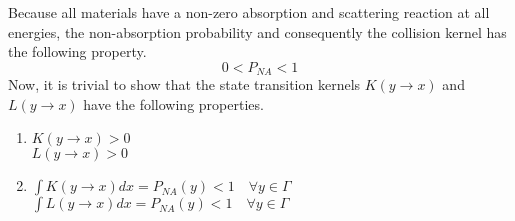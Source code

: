 Because all materials have a non-zero absorption and scattering reaction
at all energies, the non-absorption probability and consequently the 
collision kernel has the following property.
\begin{equation*}
  0 < P_{NA} < 1
\end{equation*}
Now, it is trivial to show that the state transition kernels $K(y \to x)$ and
$L(y \to x)$ have the following properties.
\begin{enumerate}
  \item $K(y \to x) > 0$ \\
    $L(y \to x) > 0$
  \item $\int K(y \to x)dx = P_{NA}(y) < 1 \quad \forall y \in \Gamma$ \\
    $\int L(y \to x)dx = P_{NA}(y) < 1 \quad \forall y \in \Gamma$
\end{enumerate}

